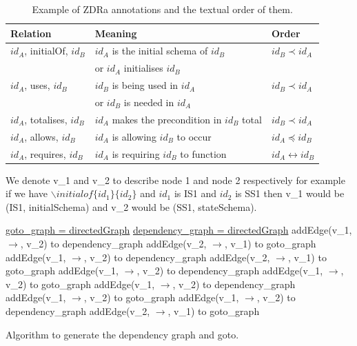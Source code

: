 \begin{table}[H]
\centering
\begin{tabular}{| l | l | l |}
\hline
\textbf{Relation} & \textbf{Meaning} & \textbf{Order} \\
\hline 
$id_{A}$, initialOf, $id_{B}$ & $id_{A}$ is the initial schema of $id_{B}$ &
$id_{B} \prec id_{A}$ \\
 & or $id_{A}$ initialises $id_{B}$ & \\
 \hline
$id_{A}$, uses, $id_{B}$ & $id_{B}$ is being used in $id_{A}$ & $id_{B} \prec
id_{A}$ \\
& or $id_{B}$ is needed in $id_{A}$ & \\
 \hline
 $id_{A}$, totalises, $id_{B}$ & $id_{A}$ makes the precondition in $id_{B}$
 total & $id_{B} \prec id_{A}$ \\
 \hline
$id_{A}$, allows, $id_{B}$ & $id_{A}$ is allowing $id_{B}$ to occur & $id_{A}
\preceq id_{B}$ \\
\hline
$id_{A}$, requires, $id_{B}$ & $id_{A}$ is requiring $id_{B}$ to function &
$id_{A} \leftrightarrow id_{B}$ \\
\hline
\end{tabular}
\caption{Example of ZDRa annotations and the textual order of them. \label{tab:texorder}}
\end{table}

\begin{defin}
We denote v\_1 and v\_2 to describe node 1 and node 2 respectively for example
if we have $\backslash initialof\{id_{1}\}\{id_{2}\}$ and $id_{1}$ is IS1 and
$id_{2}$ is SS1 then v\_1 would be (IS1, initialSchema) and v\_2 would be (SS1,
stateSchema).
\end{defin}

\begin{algorithm}[H] \underline{goto\_graph = directedGraph} \;
\underline{dependency\_graph = directedGraph} \; \SetAlgoLined
{} 
{addEdge(v\_1, $\rightarrow$, v\_2) to dependency\_graph \; addEdge(v\_2,
$\rightarrow$, v\_1)  to goto\_graph\;}
{addEdge(v\_1, $\rightarrow$, v\_2) to dependency\_graph \; addEdge(v\_2,
$\rightarrow$, v\_1)  to goto\_graph \;}
{addEdge(v\_1, $\rightarrow$, v\_2) to dependency\_graph \; addEdge(v\_1,
$\rightarrow$, v\_2)  to goto\_graph \;}
{addEdge(v\_1, $\rightarrow$, v\_2) to dependency\_graph \; addEdge(v\_1,
$\rightarrow$, v\_2)  to goto\_graph \;}
{addEdge(v\_1, $\rightarrow$, v\_2) to dependency\_graph \; addEdge(v\_2,
$\rightarrow$, v\_1)  to goto\_graph \;}
\caption{Algorithm to generate the dependency graph and goto. \label{alg:gotodep} }
\end{algorithm}
\vspace{0.2in}


